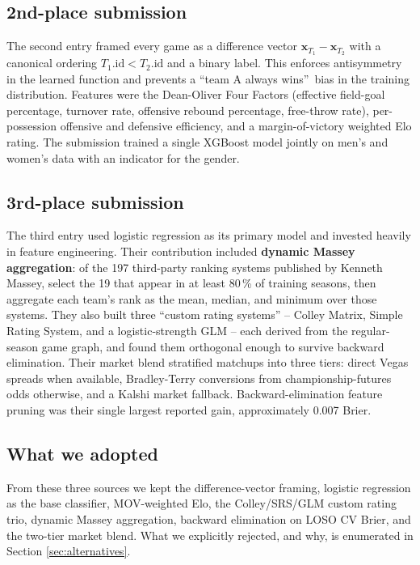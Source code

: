 \documentclass[11pt, a4paper]{article}
\begin{document}
\subsection{2nd-place submission}
The second entry framed every game as a difference vector $\mathbf{x}_{T_1} - \mathbf{x}_{T_2}$ with a canonical ordering $T_1.\text{id} < T_2.\text{id}$ and a binary label. This enforces antisymmetry in the learned function and prevents a ``team A always wins''\ bias in the training distribution. Features were the Dean-Oliver Four Factors (effective field-goal percentage, turnover rate, offensive rebound percentage, free-throw rate), per-possession offensive and defensive efficiency, and a margin-of-victory weighted Elo rating. The submission trained a single XGBoost model jointly on men's and women's data with an indicator for the gender.

\subsection{3rd-place submission}
The third entry used logistic regression as its primary model and invested heavily in feature engineering. Their contribution included \textbf{dynamic Massey aggregation}: of the 197 third-party ranking systems published by Kenneth Massey, select the 19 that appear in at least 80\,\% of training seasons, then aggregate each team's rank as the mean, median, and minimum over those systems. They also built three ``custom rating systems'' -- Colley Matrix, Simple Rating System, and a logistic-strength GLM -- each derived from the regular-season game graph, and found them orthogonal enough to survive backward elimination. Their market blend stratified matchups into three tiers: direct Vegas spreads when available, Bradley-Terry conversions from championship-futures odds otherwise, and a Kalshi market fallback. Backward-elimination feature pruning was their single largest reported gain, approximately 0.007 Brier.

\subsection{What we adopted}
From these three sources we kept the difference-vector framing, logistic regression as the base classifier, MOV-weighted Elo, the Colley/SRS/GLM custom rating trio, dynamic Massey aggregation, backward elimination on LOSO CV Brier, and the two-tier market blend. What we explicitly rejected, and why, is enumerated in Section \ref{sec:alternatives}.
\end{document}
